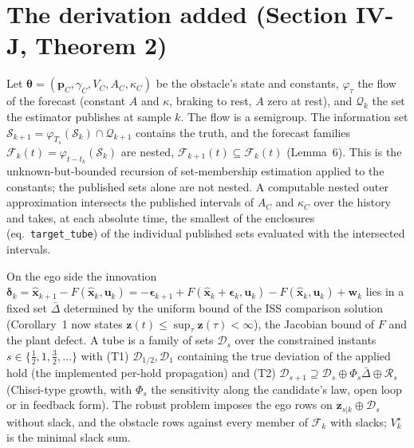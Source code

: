 \documentclass[11pt]{article}
\begin{document}
\section{The derivation added (Section IV-J, Theorem 2)}
Let $\boldsymbol\theta=(\boldsymbol p_C,\gamma_C,V_C,A_C,\kappa_C)$ be the
obstacle's state and constants, $\varphi_\tau$ the flow of the forecast
(constant $A$ and $\kappa$, braking to rest, $A$ zero at rest), and
$\mathcal Q_k$ the set the estimator publishes at sample $k$. The flow is a
semigroup. The information set
$\mathcal S_{k+1}=\varphi_{T_s}(\mathcal S_k)\cap\mathcal Q_{k+1}$ contains the
truth, and the forecast families $\mathcal F_k(t)=\varphi_{t-t_k}(\mathcal S_k)$
are nested, $\mathcal F_{k+1}(t)\subseteq\mathcal F_k(t)$ (Lemma~6). This is
the unknown-but-bounded recursion of set-membership estimation applied to the
constants; the published sets alone are not nested. A computable nested outer
approximation intersects the published intervals of $A_C$ and $\kappa_C$ over
the history and takes, at each absolute time, the smallest of the enclosures
(eq.\ \texttt{target\_tube}) of the individual published sets evaluated with the
intersected intervals.

On the ego side the innovation
$\boldsymbol\delta_k=\hat{\boldsymbol x}_{k+1}-F(\hat{\boldsymbol x}_k,\boldsymbol u_k)
=-\boldsymbol\epsilon_{k+1}+F(\hat{\boldsymbol x}_k+\boldsymbol\epsilon_k,\boldsymbol u_k)
-F(\hat{\boldsymbol x}_k,\boldsymbol u_k)+\boldsymbol w_k$ lies in a fixed set
$\bar\Delta$ determined by the uniform bound of the ISS comparison solution
(Corollary~1 now states $\boldsymbol z(t)\le\sup_\tau\boldsymbol z(\tau)<\infty$),
the Jacobian bound of $F$ and the plant defect. A tube is a family of sets
$\mathcal D_s$ over the constrained instants $s\in\{\tfrac12,1,\tfrac32,\dots\}$
with (T1) $\mathcal D_{1/2},\mathcal D_1$ containing the true deviation of the
applied hold (the implemented per-hold propagation) and (T2)
$\mathcal D_{s+1}\supseteq\mathcal D_s\oplus\Phi_s\bar\Delta\oplus\mathcal R_s$
(Chisci-type growth, with $\Phi_s$ the sensitivity along the candidate's law,
open loop or in feedback form). The robust problem imposes the ego rows on
$\boldsymbol z_{s|k}\oplus\mathcal D_s$ without slack, and the obstacle rows
against every member of $\mathcal F_k$ with slacks; $V_k^\star$ is the minimal
slack sum.
\end{document}
